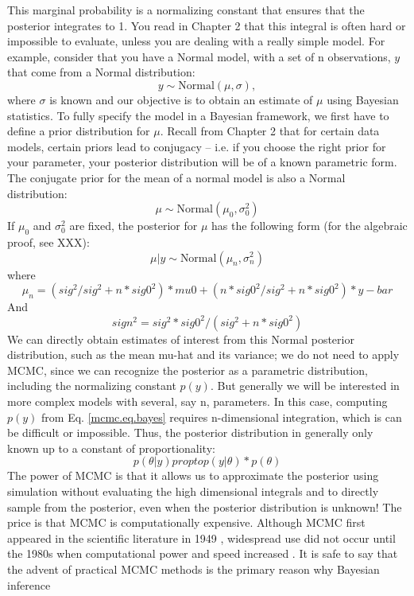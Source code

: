 This marginal probability is a normalizing constant that ensures that
the posterior integrates to 1. You read in Chapter 2 that this
integral is often hard or impossible to evaluate, unless you are
dealing with a really simple model.  For example, consider that you
have a Normal model, with a set of n observations, $y$ that come from a
Normal distribution:
\[
 y \sim \mbox{Normal}(\mu, \sigma),
\]
where $\sigma$ is known and our objective is to obtain an estimate of
$\mu$ using Bayesian statistics. To fully specify the model in a Bayesian
framework, we first have to define a prior distribution for $\mu$. Recall
from Chapter 2 that for certain data models, certain priors lead to
conjugacy – i.e. if you choose the right prior for your parameter,
your posterior distribution will be of a known parametric form. The
conjugate prior for the mean of a normal model is also a Normal
distribution:
\[
\mu \sim \mbox{Normal}(\mu_0, \sigma_{0}^{2})
\]
If $\mu_{0}$ and $\sigma_{0}^{2}$ are fixed, the posterior for $\mu$ has the following form (for the algebraic proof, see XXX):
\begin{equation}
\mu|y \sim \mbox{Normal}(\mu_{n}, \sigma_{n}^{2})
\label{mcmc.eq.mu-posterior}
\end{equation}
where
\[
\mu_{n} =  (sig^2 / sig^2  +n* sig0^2)*  mu0 + (n * sig0^2 / sig^2  +n* sig0^2) *y-bar
\]
And
\[
 sign^2 = sig^2 * sig0^2 / (sig^2 + n*sig0^2)
\]
We can directly obtain estimates of interest from this Normal
posterior distribution, such as the mean mu-hat and its variance; we
do not need to apply MCMC, since we can recognize the posterior as a
parametric distribution, including the normalizing constant $p(y)$.
But generally we will be interested in more complex models with
several, say n, parameters. In this case, computing $p(y)$ from
Eq. \ref{mcmc.eq.bayes} requires n-dimensional integration, which is
can be difficult or impossible. Thus, the posterior distribution in
generally only known up to a constant of proportionality:
\[
p(\theta|y) propto p(y|\theta) * p(\theta)
\]
The power of MCMC is that it allows us to approximate the posterior
using simulation without evaluating the high dimensional integrals and
to directly sample from the posterior, even when the posterior
distribution is unknown! The price is that MCMC is computationally
expensive. Although MCMC first appeared in the scientific literature
in 1949 \citep{metropolis_etal:1949}, widespread use did not occur
until the 1980s when computational power and speed increased
\citep{gelfand_smith:1990}. It is safe to say that the advent of
practical MCMC methods is the primary reason why Bayesian inference
